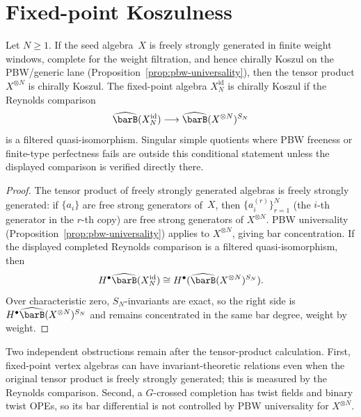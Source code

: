 
\section{Fixed-point Koszulness}
\label{sec:symn-koszulness}

\begin{proposition}\label{prop:symn-koszulness}
Let $N\geq1$. If the seed algebra~$X$ is freely strongly generated
in finite weight windows, complete for the weight filtration, and
hence chirally Koszul on the PBW/generic lane
(Proposition~\textup{\ref{prop:pbw-universality}}), then the
tensor product $X^{\otimes N}$ is chirally Koszul. The fixed-point
algebra $X_N^{\mathrm{id}}$ is chirally Koszul if the Reynolds
comparison
\[
 \widehat{\barB}(X_N^{\mathrm{id}})
 \longrightarrow
 \widehat{\barB}(X^{\otimes N})^{S_N}
\]
is a filtered quasi-isomorphism. Singular simple quotients where
PBW freeness or finite-type perfectness fails are outside this
conditional statement unless the displayed comparison is verified
directly there.
\end{proposition}

\begin{proof}
The tensor product of freely strongly generated algebras is freely
strongly generated: if $\{a_i\}$ are free strong generators of~$X$,
then $\{a_i^{(r)}\}_{r=1}^N$ (the $i$-th generator in the $r$-th
copy) are free strong generators of $X^{\otimes N}$. PBW
universality (Proposition~\ref{prop:pbw-universality}) applies to
$X^{\otimes N}$, giving bar concentration. If the displayed completed
Reynolds comparison is a filtered quasi-isomorphism, then
\[
 H^\bullet\widehat{\barB}(X_N^{\mathrm{id}})
 \cong H^\bullet(\widehat{\barB}(X^{\otimes N})^{S_N}).
\]
Over characteristic zero, $S_N$-invariants are exact, so the right
side is $H^\bullet\widehat{\barB}(X^{\otimes N})^{S_N}$ and remains
concentrated in the same bar degree, weight by weight.
\end{proof}

\begin{remark}
\label{rem:symn-full-koszulness}
Two independent obstructions remain after the tensor-product
calculation. First, fixed-point vertex algebras can have
invariant-theoretic relations even when the original tensor product
is freely strongly generated; this is measured by the Reynolds
comparison. Second, a $G$-crossed completion has twist fields and
binary twist OPEs, so its bar differential is not controlled by PBW
universality for $X^{\otimes N}$.
\end{remark}


